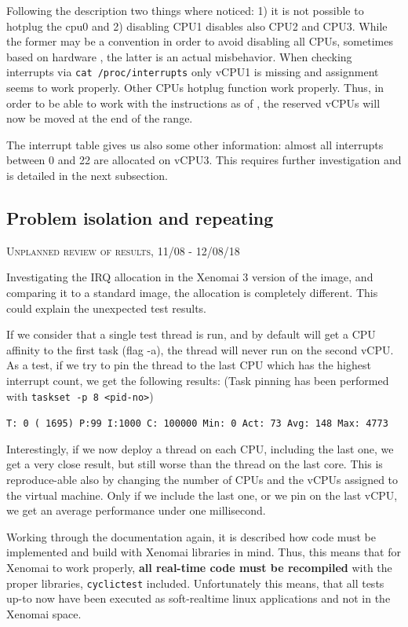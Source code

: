 \documentclass[]{scrartcl}
\begin{document}
Following the description two things where noticed: 1) it is not possible to hotplug the cpu0 and 2) disabling CPU1 disables also CPU2 and CPU3.
While the former may be a convention in order to avoid disabling all CPUs, sometimes based on hardware \cite{lwn01}, the latter is an actual misbehavior. 
When checking interrupts via \texttt{cat /proc/interrupts} only vCPU1 is missing and assignment seems to work properly. Other CPUs hotplug function work properly. 
Thus, in order to be able to work with the instructions as of \cite{lwn01}, the reserved vCPUs will now be moved at the end of the range. 

The interrupt table gives us also some other information: almost all interrupts between 0 and 22 are allocated on vCPU3. This requires further investigation and is detailed in the next subsection.

\subsection{Problem isolation and repeating}
\label{sec:isol}

{\small\textsc{Unplanned review of results, 11/08 - 12/08/18} \bigskip}

Investigating the IRQ allocation in the Xenomai 3 version of the image, and comparing it to a standard image, the allocation is completely different. This could explain the unexpected test results.

If we consider that a single test thread is run, and by default will get a CPU affinity to the first task (flag -a), the thread will never run on the second vCPU. As a test, if we try to pin the thread to the last CPU which has the highest interrupt count, we get the following results: (Task pinning has been performed with \texttt{taskset -p 8 <pid-no>})

\bigskip

\noindent \small \texttt{T: 0 ( 1695) P:99 I:1000 C: 100000 Min:      0 Act:   73 Avg:  148 Max:    4773}


Interestingly, if we now deploy a thread on each CPU, including the last one, we get a very close result, but still worse than the thread on the last core.
This is reproduce-able also by changing the number of CPUs and the vCPUs assigned to the virtual machine. 
Only if we include the last one, or we pin on the last vCPU, we get an average performance under one millisecond.

Working through the documentation again, it is described how code must be implemented and build with Xenomai libraries in mind. 
Thus, this means that for Xenomai to work properly, \textbf{all real-time code must be recompiled} with the proper libraries, \texttt{cyclictest} included. Unfortunately this means, that all tests up-to now have been executed as soft-realtime linux applications and not in the Xenomai space.
\end{document}
